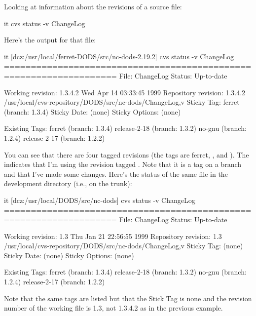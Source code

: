 \documentclass{dods-paper}
\begin{document}
Looking at information about the revisions of a source file:

\begin{vcode}{it}
cvs status -v ChangeLog
\end{vcode}

Here's the output for that file:

\begin{vcode}{it}
[dcz:/usr/local/ferret-DODS/src/nc-dods-2.19.2] cvs status -v ChangeLog
===================================================================
File: ChangeLog         Status: Up-to-date

   Working revision:    1.3.4.2 Wed Apr 14 03:33:45 1999
   Repository revision: 1.3.4.2 /usr/local/cvs-repository/DODS/src/nc-dods/ChangeLog,v
   Sticky Tag:          ferret (branch: 1.3.4)
   Sticky Date:         (none)
   Sticky Options:      (none)

   Existing Tags:
	ferret                          (branch: 1.3.4)
	release-2-18                    (branch: 1.3.2)
	no-gnu                          (branch: 1.2.4)
	release-2-17                    (branch: 1.2.2)
\end{vcode}

You can see that there are four tagged revisions (the tags are ferret,
,  and ). The  indicates that I'm using the revision tagged . Note that it
is a tag on a branch and that I've made some changes. Here's the status of
the same file in the development directory (i.e., on the trunk):

\begin{vcode}{it}
[dcz:/usr/local/DODS/src/nc-dods] cvs status -v ChangeLog
===================================================================
File: ChangeLog         Status: Up-to-date

   Working revision:    1.3     Thu Jan 21 22:56:55 1999
   Repository revision: 1.3     /usr/local/cvs-repository/DODS/src/nc-dods/ChangeLog,v
   Sticky Tag:          (none)
   Sticky Date:         (none)
   Sticky Options:      (none)

   Existing Tags:
	ferret                          (branch: 1.3.4)
	release-2-18                    (branch: 1.3.2)
	no-gnu                          (branch: 1.2.4)
	release-2-17                    (branch: 1.2.2)
\end{vcode}

Note that the same tags are listed but that the Stick Tag is none and the
revision number of the working file is 1.3, not 1.3.4.2 as in the previous
example.
\end{document}
